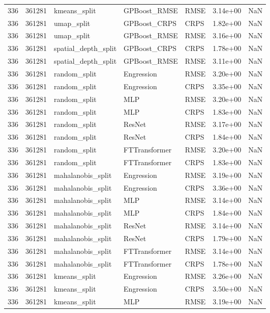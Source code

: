\begin{tabular}{rrlllrr}
336 & 361281 & kmeans\_split & GPBoost\_RMSE & RMSE & 3.14e+00 & NaN \\
336 & 361281 & umap\_split & GPBoost\_CRPS & CRPS & 1.82e+00 & NaN \\
336 & 361281 & umap\_split & GPBoost\_RMSE & RMSE & 3.16e+00 & NaN \\
336 & 361281 & spatial\_depth\_split & GPBoost\_CRPS & CRPS & 1.78e+00 & NaN \\
336 & 361281 & spatial\_depth\_split & GPBoost\_RMSE & RMSE & 3.11e+00 & NaN \\
336 & 361281 & random\_split & Engression & RMSE & 3.20e+00 & NaN \\
336 & 361281 & random\_split & Engression & CRPS & 3.35e+00 & NaN \\
336 & 361281 & random\_split & MLP & RMSE & 3.20e+00 & NaN \\
336 & 361281 & random\_split & MLP & CRPS & 1.83e+00 & NaN \\
336 & 361281 & random\_split & ResNet & RMSE & 3.17e+00 & NaN \\
336 & 361281 & random\_split & ResNet & CRPS & 1.84e+00 & NaN \\
336 & 361281 & random\_split & FTTransformer & RMSE & 3.20e+00 & NaN \\
336 & 361281 & random\_split & FTTransformer & CRPS & 1.83e+00 & NaN \\
336 & 361281 & mahalanobis\_split & Engression & RMSE & 3.19e+00 & NaN \\
336 & 361281 & mahalanobis\_split & Engression & CRPS & 3.36e+00 & NaN \\
336 & 361281 & mahalanobis\_split & MLP & RMSE & 3.14e+00 & NaN \\
336 & 361281 & mahalanobis\_split & MLP & CRPS & 1.84e+00 & NaN \\
336 & 361281 & mahalanobis\_split & ResNet & RMSE & 3.14e+00 & NaN \\
336 & 361281 & mahalanobis\_split & ResNet & CRPS & 1.79e+00 & NaN \\
336 & 361281 & mahalanobis\_split & FTTransformer & RMSE & 3.14e+00 & NaN \\
336 & 361281 & mahalanobis\_split & FTTransformer & CRPS & 1.78e+00 & NaN \\
336 & 361281 & kmeans\_split & Engression & RMSE & 3.26e+00 & NaN \\
336 & 361281 & kmeans\_split & Engression & CRPS & 3.50e+00 & NaN \\
336 & 361281 & kmeans\_split & MLP & RMSE & 3.19e+00 & NaN \\

\end{tabular}
